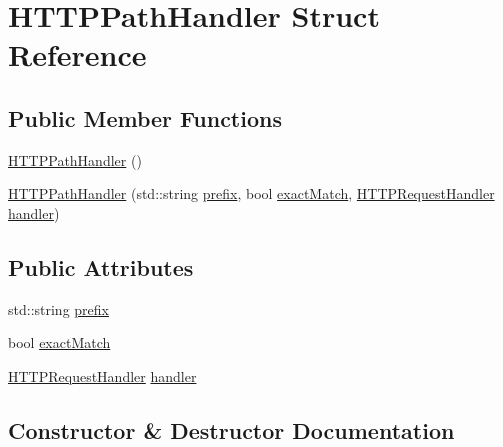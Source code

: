 \hypertarget{struct_h_t_t_p_path_handler}{}\section{H\+T\+T\+P\+Path\+Handler Struct Reference}
\label{struct_h_t_t_p_path_handler}
\subsection*{Public Member Functions}
\begin{DoxyCompactItemize}
\item 
\mbox{\hyperlink{struct_h_t_t_p_path_handler_acdfd2521c5f888e52d9a7c14bd5c6781}{H\+T\+T\+P\+Path\+Handler}} ()
\item 
\mbox{\hyperlink{struct_h_t_t_p_path_handler_a9161b61163110ac69e928bc128b1a47c}{H\+T\+T\+P\+Path\+Handler}} (std\+::string \mbox{\hyperlink{struct_h_t_t_p_path_handler_a3653c57a029382a867dc68e102a353cf}{prefix}}, bool \mbox{\hyperlink{struct_h_t_t_p_path_handler_a2f7ea5761b24c8987869faf40af28a60}{exact\+Match}}, \mbox{\hyperlink{httpserver_8h_a90b0a9a188f591e83851dad2b701088f}{H\+T\+T\+P\+Request\+Handler}} \mbox{\hyperlink{struct_h_t_t_p_path_handler_ad741823790ab387e0962875861a91e67}{handler}})
\end{DoxyCompactItemize}
\subsection*{Public Attributes}
\begin{DoxyCompactItemize}
\item 
std\+::string \mbox{\hyperlink{struct_h_t_t_p_path_handler_a3653c57a029382a867dc68e102a353cf}{prefix}}
\item 
bool \mbox{\hyperlink{struct_h_t_t_p_path_handler_a2f7ea5761b24c8987869faf40af28a60}{exact\+Match}}
\item 
\mbox{\hyperlink{httpserver_8h_a90b0a9a188f591e83851dad2b701088f}{H\+T\+T\+P\+Request\+Handler}} \mbox{\hyperlink{struct_h_t_t_p_path_handler_ad741823790ab387e0962875861a91e67}{handler}}
\end{DoxyCompactItemize}


\subsection{Constructor \& Destructor Documentation}
\mbox{\label{struct_h_t_t_p_path_handler_acdfd2521c5f888e52d9a7c14bd5c6781}} 
